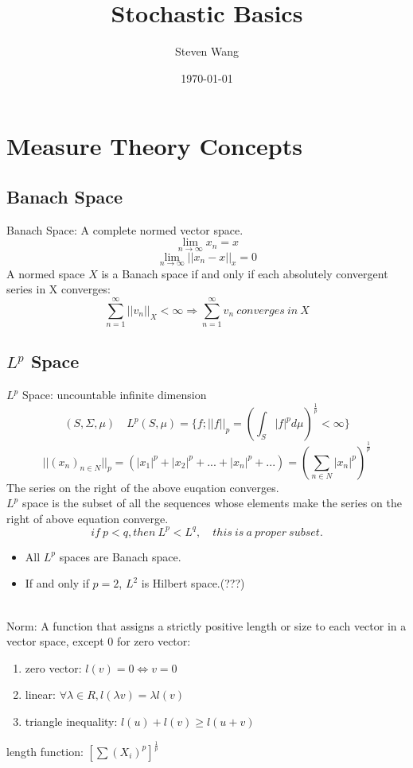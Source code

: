 \documentclass[12pt]{article}
\begin{document}
\title{Stochastic Basics}
\author{Steven Wang}
\date{\today}
\maketitle

\tableofcontents

\section{Measure Theory Concepts}
\subsection{Banach Space}
Banach Space: A complete normed vector space.
$$\lim_{n\to\infty}x_n=x$$
$$\lim_{n\to\infty}||x_n-x||_x=0$$
A normed space $X$ is a Banach space if and only if each absolutely convergent series in X converges:
$$\sum_{n=1}^\infty||v_n||_X<\infty \Rightarrow \sum_{n=1}^\infty v_n\ converges\ in\ X$$


\subsection{$L^p$ Space}
$L^p$ Space: uncountable infinite dimension
$$(S,\Sigma,\mu)\quad L^p(S,\mu)=\{f; ||f||_p=(\int_S|f|^p d\mu)^{\frac{1}{p}}<\infty\}$$
$$||(x_n)_{n\in N}||_p=(|x_1|^p+|x_2|^p+...+|x_n|^p+...)=(\sum_{n\in N}|x_n|^p)^{\frac{1}{p}}$$
\indent The series on the right of the above euqation converges.
\\
\indent $L^p$ space is the subset of all the sequences whose elements make the series on the right of above equation converge.
\\
$$if\ p<q,then\ L^p<L^q,\quad this\ is\ a\ proper\ subset.$$
\begin{itemize}
    \item All $L^p$ spaces are Banach space.
    \item If and only if $p=2$, $L^2$ is Hilbert space.(???)
\end{itemize}
\\
Norm: A function that assigns a strictly positive length or size to each vector in a vector space, except 0 for zero vector:
\begin{enumerate}
    \item zero vector: $l(v)=0\Leftrightarrow v=0$
    \item linear: $\forall\lambda\in R, l(\lambda v)=\lambda l(v)$
    \item triangle inequality: $l(u)+l(v)\geq l(u+v)$
\end{enumerate}
\indent length function: $[\sum(X_i)^p]^{\frac{1}{p}}$
\end{document}

